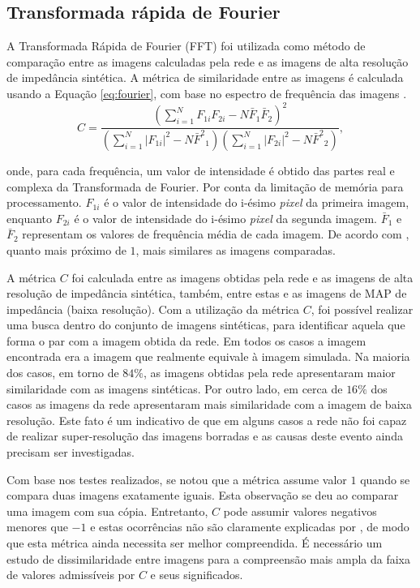 \subsection{Transformada rápida de Fourier}

A Transformada Rápida de Fourier (FFT) foi utilizada como método de comparação entre as imagens calculadas pela rede
e as imagens de alta resolução de impedância sintética. A métrica de similaridade entre as imagens é calculada usando
a Equação \ref{eq:fourier}, com base no espectro de frequência das imagens \citep{Narayana15}.
\begin{equation}
 C = \frac{ (\sum_{i=1}^{N}{F_{1i}F_{2i}} - N \bar{F}_1\bar{F}_2 )^2 }{ (\sum_{i=1}^{N}{|F_{1i}|^2} - N{\bar{F}^2}_1)( \sum_{i=1}^{N}{|F_{2i}|^2} - N{\bar{F}^2}_2 )},
 \label{eq:fourier}
\end{equation}

onde, para cada frequência, um valor de intensidade é obtido das partes real e complexa da Transformada de Fourier.
Por conta da limitação de memória para processamento. $F_{1i}$ é o valor de intensidade do i-ésimo \textit{pixel} da primeira imagem, enquanto $F_{2i}$
é o valor de intensidade do i-ésimo \textit{pixel} da segunda imagem. $\bar{F}_1$ e $\bar{F}_2$ representam os valores
de frequência média de cada imagem. De acordo com \cite{Narayana15}, quanto mais próximo de $1$, mais similares as imagens
comparadas.

A métrica $C$ foi calculada entre as imagens obtidas pela rede e as imagens de alta resolução de impedância sintética, também, entre estas e
as imagens de MAP de impedância (baixa resolução). Com a utilização da métrica $C$, foi possível realizar uma busca dentro do conjunto de 
imagens sintéticas, para identificar aquela que forma o par com a imagem obtida da rede. Em todos os casos a imagem encontrada era a imagem
que realmente equivale à imagem simulada. Na maioria dos casos, em torno de $84\%$, as imagens obtidas pela rede
apresentaram maior similaridade com as imagens sintéticas. Por outro lado, em cerca de $16\%$ dos casos as imagens da rede apresentaram mais similaridade com
a imagem de baixa resolução. Este fato é um indicativo de que em alguns casos a rede não foi capaz de realizar super-resolução das imagens borradas e
as causas deste evento ainda precisam ser investigadas.

Com base nos testes realizados, se notou que a métrica assume valor $1$ quando se compara duas imagens exatamente iguais.
Esta observação se deu ao comparar uma imagem com sua cópia. Entretanto, $C$ pode assumir valores negativos menores que $-1$ e estas ocorrências
não são claramente explicadas por \cite{Narayana15}, de modo que esta métrica ainda necessita ser melhor compreendida. É necessário
um estudo de dissimilaridade entre imagens para a compreensão mais ampla da faixa de valores admissíveis por $C$ e seus significados.


